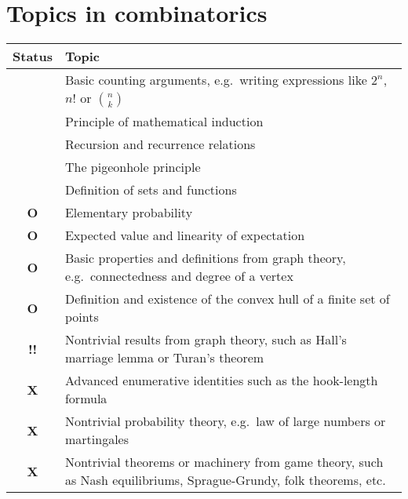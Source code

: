 \documentclass[11pt]{scrartcl}
\providecommand{\isRq}{{\color{green!60!black}\CheckmarkBold}}
\providecommand{\isUs}{{\color{cyan}\sffamily\bfseries O}}
\providecommand{\isAv}{{\color{gray}\sffamily\bfseries !!}}
\providecommand{\isEx}{{\color{red}\sffamily\bfseries X}}
\begin{document}
\section{Topics in combinatorics}
\begin{center}
  \begin{tabular}{cp{12cm}}
  \toprule Status & Topic \\ \midrule
  \isRq & Basic counting arguments, e.g.\
    writing expressions like $2^n$, $n!$ or $\binom nk$ \\
  \isRq & Principle of mathematical induction \\
  \isRq & Recursion and recurrence relations \\
  \isRq & The pigeonhole principle \\
  \isRq & Definition of sets and functions \\
  \isUs & Elementary probability \\
  \isUs & Expected value and linearity of expectation \\
  \isUs & Basic properties and definitions from graph theory,
    e.g.\ connectedness and degree of a vertex \\
  \isUs & Definition and existence of the convex hull of a finite set of points \\
  \isAv & Nontrivial results from graph theory,
    such as Hall's marriage lemma or Turan's theorem \\
  \isEx & Advanced enumerative identities such as the hook-length formula \\
  \isEx & Nontrivial probability theory, e.g.\ law of large numbers or martingales \\
  \isEx & Nontrivial theorems or machinery from game theory,
    such as Nash equilibriums, Sprague-Grundy, folk theorems, etc. \\
  \bottomrule
  \end{tabular}
\end{center}
\end{document}
